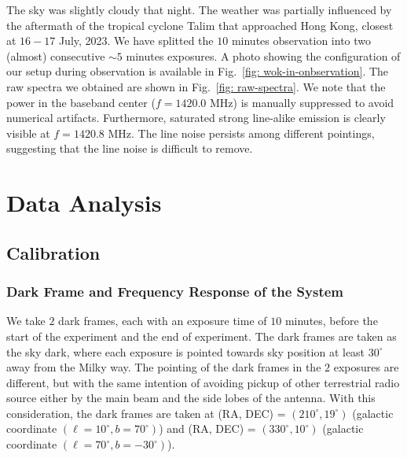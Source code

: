 \documentclass[12pt]{article}
\begin{document}
    The sky was slightly cloudy that night. 
    The weather was partially influenced by the aftermath of the tropical cyclone Talim that approached Hong Kong, closest at $16-17$ July, 2023. 
    We have splitted the $10$ minutes observation into two (almost) consecutive $\sim 5$ minutes exposures.
    A photo showing the configuration of our setup during observation is available in Fig.~\ref{fig: wok-in-onbservation}.
    The raw spectra we obtained are shown in Fig.~\ref{fig: raw-spectra}.
    We note that the power in the baseband center ($f = 1420.0$ MHz) is manually suppressed to avoid numerical artifacts.
    Furthermore, saturated strong line-alike emission is clearly visible at $f=1420.8$ MHz.
    The line noise persists among different pointings, suggesting that the line noise is difficult to remove. 
    
    \section{Data Analysis} \label{sect: data-pipeline}
    \subsection{Calibration}
    \subsubsection{Dark Frame and Frequency Response of the System} \label{sect: dark-frame}
    We take $2$ dark frames, each with an exposure time of $10$ minutes, before the start of the experiment and the end of experiment. 
    The dark frames are taken as the sky dark, where each exposure is pointed towards sky position at least $30^\circ$ away from the Milky way. 
    The pointing of the dark frames in the $2$ exposures are different, but with the same intention of avoiding pickup of other terrestrial radio source either by the main beam and the side lobes of the antenna. 
    With this consideration, the dark frames are taken at (RA, DEC) = $(210^\circ, 19^\circ)$ (galactic coordinate $(\ell = 10^\circ, b =70^\circ)$) and (RA, DEC) = $(330^\circ,10^\circ)$ (galactic coordinate $(\ell = 70^\circ, b =-30^\circ)$). 
\end{document}

